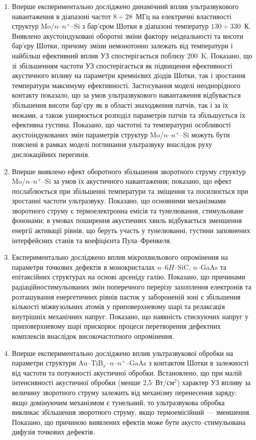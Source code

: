 \begin{enumerate}[leftmargin=0cm,itemindent=3em]
\item
Вперше експериментально досліджено динамічний вплив ультразвукового навантаження в діапазоні частот $8\div28$~МГц на електричні властивості структур Mo/$n$--$n^{+}$--Si з бар'єром Шотки в діапазоні температур $130\div330$~К.
 Виявлено акустоіндуковані оборотні зміни фактору неідеальності та висоти бар'єру Шотки, причому зміни немонотонно залежать від температури і найбільш ефективний вплив УЗ спостерігається поблизу 200~K.
  Показано, що зі збільшенням частоти УЗ  спостерігається як підвищення ефективності акустичного впливу на параметри кремнієвих діодів Шотки,
так і зростання температури максимуму ефективності.
 Застосування моделі неоднорідного контакту показало, що за умов ультразвукового навантаження відбувається збільшення висоти бар'єру як в області знаходження патчів, так і за їх межами, а також уширюється розподіл параметрів патчів та збільшується їх ефективна густина.
Показано, що частотні та температурні особливості акустоіндукованих змін параметрів структур Mo/$n$--$n^{+}$--Si можуть бути пояснені в рамках
 моделі поглинання ультразвуку внаслідок руху дислокаційних перегинів.

\item Вперше виявлено ефект оборотного збільшення зворотного струму структур Mo/$n$--$n^{+}$--Si за умов їх акустичного навантаження;
показано, що ефект послаблюється при збільшенні температури та зміщення та посилюється при зростанні частоти ультразвуку.
Показано, що основними механізмами зворотного струму є термоелектронна емісія та тунелювання, стимульоване фононами;
в умовах поширення акустичних хвиль відбувається зменшення енергії активації рівнів, що беруть участь у тунелюванні,
густини заповнених інтерфейсних станів та коефіцієнта Пула--Френкеля.

\item Експериментально досліджено вплив мікрохвильового опромінення на параметри точкових дефектів в монокристалах $n$--6$H$--SiC, $n$--GaAs та епітаксійних структурах на основі арсеніду галію.
Показано, що причинами радіаційностимульованих змін поперечного перерізу захоплення електронів та розташування енергетичних рівнів пасток у забороненій зоні є
збільшення кількості міжвузольних атомів у приповерхневому шарі та релаксація внутрішніх механічних напруг.
Показано, що наявність стискуючих напруг у приповерхневому шарі прискорює процеси перетворення дефектних комплексів внаслідок високочастотного опромінення.

\item Вперше експериментально досліджено вплив ультразвукової обробки на параметри структури Au--TiB$_x$--$n$--$n^+$--GaAs з контактом Шотки
 в залежності від частоти та потужності акустичної обробки.
Встановлено, що при малій інтенсивності акустичної обробки (менше 2,5~Вт/см$^2$) характер УЗ впливу за величину зворотного струму залежить від механізму перенесення заряду:
  якщо домінуючим механізмом є тунельний, то ультразвукова обробка викликає збільшення зворотного струму, якщо термоемісійний --- зменшення.
  Показано, що причиною виявлених ефектів може бути акусто--стимульована дифузія точкових дефектів.




\end{enumerate}
